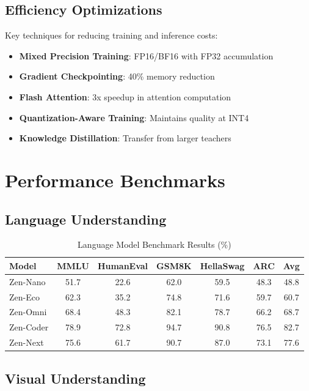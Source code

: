 \documentclass[11pt,a4paper]{article}
\begin{document}
\subsection{Efficiency Optimizations}

Key techniques for reducing training and inference costs:
\begin{itemize}
    \item \textbf{Mixed Precision Training}: FP16/BF16 with FP32 accumulation
    \item \textbf{Gradient Checkpointing}: 40\% memory reduction
    \item \textbf{Flash Attention}: 3x speedup in attention computation
    \item \textbf{Quantization-Aware Training}: Maintains quality at INT4
    \item \textbf{Knowledge Distillation}: Transfer from larger teachers
\end{itemize}

\section{Performance Benchmarks}

\subsection{Language Understanding}

\begin{table}[H]
\centering
\begin{tabular}{lcccccc}
\toprule
\textbf{Model} & \textbf{MMLU} & \textbf{HumanEval} & \textbf{GSM8K} & \textbf{HellaSwag} & \textbf{ARC} & \textbf{Avg} \\
\midrule
Zen-Nano & 51.7 & 22.6 & 62.0 & 59.5 & 48.3 & 48.8 \\
Zen-Eco & 62.3 & 35.2 & 74.8 & 71.6 & 59.7 & 60.7 \\
Zen-Omni & 68.4 & 48.3 & 82.1 & 78.7 & 66.2 & 68.7 \\
Zen-Coder & 78.9 & 72.8 & 94.7 & 90.8 & 76.5 & 82.7 \\
Zen-Next & 75.6 & 61.7 & 90.7 & 87.0 & 73.1 & 77.6 \\
\bottomrule
\end{tabular}
\caption{Language Model Benchmark Results (\%)}
\end{table}

\subsection{Visual Understanding}
\end{document}
